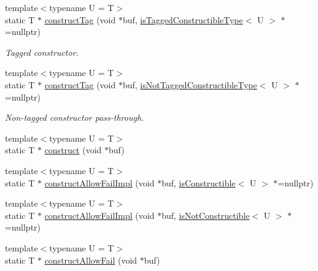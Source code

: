 \begin{DoxyCompactItemize}
{\footnotesize template$<$typename U  = T$>$ }\\static T $\ast$ \hyperlink{structcheckpoint_1_1dispatch_1_1_reconstructor_ac702decacef9a6ef4d0cf5492187b9ab}{construct\+Tag} (void $\ast$buf, \hyperlink{structcheckpoint_1_1dispatch_1_1_reconstructor_a59b6cbc4d45b5b293cbd1cd622ba86f9}{is\+Tagged\+Constructible\+Type}$<$ U $>$ $\ast$=nullptr)
\begin{DoxyCompactList}\small\item\em Tagged constructor. \end{DoxyCompactList}\item 
{\footnotesize template$<$typename U  = T$>$ }\\static T $\ast$ \hyperlink{structcheckpoint_1_1dispatch_1_1_reconstructor_a116025ae56a26ed4d6a51b999f57fd47}{construct\+Tag} (void $\ast$buf, \hyperlink{structcheckpoint_1_1dispatch_1_1_reconstructor_ad77b3a3fcf6fe7ed97698d6ca42b16c7}{is\+Not\+Tagged\+Constructible\+Type}$<$ U $>$ $\ast$=nullptr)
\begin{DoxyCompactList}\small\item\em Non-\/tagged constructor pass-\/through. \end{DoxyCompactList}\item 
{\footnotesize template$<$typename U  = T$>$ }\\static T $\ast$ \hyperlink{structcheckpoint_1_1dispatch_1_1_reconstructor_a31a927731c0b265003a416e8d20616a1}{construct} (void $\ast$buf)
\item 
{\footnotesize template$<$typename U  = T$>$ }\\static T $\ast$ \hyperlink{structcheckpoint_1_1dispatch_1_1_reconstructor_ac4eac94cd715ae6637f5f5c52bb78584}{construct\+Allow\+Fail\+Impl} (void $\ast$buf, \hyperlink{structcheckpoint_1_1dispatch_1_1_reconstructor_a6bba60a4c85d06d3e17388dfc5a55554}{is\+Constructible}$<$ U $>$ $\ast$=nullptr)
\item 
{\footnotesize template$<$typename U  = T$>$ }\\static T $\ast$ \hyperlink{structcheckpoint_1_1dispatch_1_1_reconstructor_a13e4fc01aaa73ef810d519a405f16264}{construct\+Allow\+Fail\+Impl} (void $\ast$buf, \hyperlink{structcheckpoint_1_1dispatch_1_1_reconstructor_acfaccf4e4d76f6fdf5fc4890f01a6744}{is\+Not\+Constructible}$<$ U $>$ $\ast$=nullptr)
\item 
{\footnotesize template$<$typename U  = T$>$ }\\static T $\ast$ \hyperlink{structcheckpoint_1_1dispatch_1_1_reconstructor_afbfa29526948dda3d9d843a377f526fc}{construct\+Allow\+Fail} (void $\ast$buf)
\end{DoxyCompactItemize}


